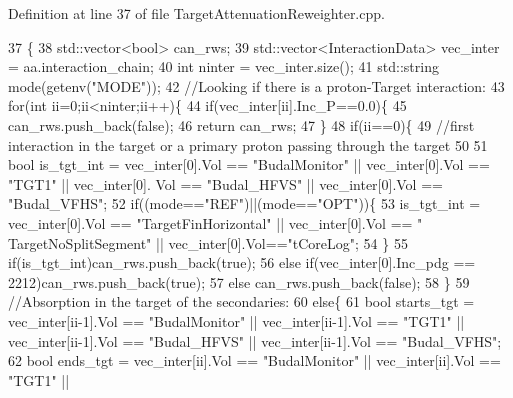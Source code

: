 Definition at line 37 of file Target\-Attenuation\-Reweighter.\-cpp.


\begin{DoxyCode}
37                                                                                         \{
38     std::vector<bool> can\_rws;
39     std::vector<InteractionData> vec\_inter = aa.interaction\_chain;
40     \textcolor{keywordtype}{int} ninter = vec\_inter.size();
41     std::string mode(getenv(\textcolor{stringliteral}{"MODE"}));
42     \textcolor{comment}{//Looking if there is a proton-Target interaction:}
43     \textcolor{keywordflow}{for}(\textcolor{keywordtype}{int} ii=0;ii<ninter;ii++)\{          
44         \textcolor{keywordflow}{if}(vec\_inter[ii].Inc\_P==0.0)\{
45           can\_rws.push\_back(\textcolor{keyword}{false});
46           \textcolor{keywordflow}{return} can\_rws;
47         \}
48     \textcolor{keywordflow}{if}(ii==0)\{
49       \textcolor{comment}{//first interaction in the target or a primary proton passing through the target }
50 
51         \textcolor{keywordtype}{bool} is\_tgt\_int = vec\_inter[0].Vol == \textcolor{stringliteral}{"BudalMonitor"} || vec\_inter[0].Vol == \textcolor{stringliteral}{"TGT1"} || vec\_inter[0].
      Vol == \textcolor{stringliteral}{"Budal\_HFVS"}  || vec\_inter[0].Vol == \textcolor{stringliteral}{"Budal\_VFHS"};
52         \textcolor{keywordflow}{if}((mode==\textcolor{stringliteral}{"REF"})||(mode==\textcolor{stringliteral}{"OPT"}))\{
53           is\_tgt\_int = vec\_inter[0].Vol == \textcolor{stringliteral}{"TargetFinHorizontal"} || vec\_inter[0].Vol == \textcolor{stringliteral}{"
      TargetNoSplitSegment"} || vec\_inter[0].Vol==\textcolor{stringliteral}{"tCoreLog"};
54         \}
55         \textcolor{keywordflow}{if}(is\_tgt\_int)can\_rws.push\_back(\textcolor{keyword}{true});
56         \textcolor{keywordflow}{else} \textcolor{keywordflow}{if}(vec\_inter[0].Inc\_pdg == 2212)can\_rws.push\_back(\textcolor{keyword}{true});
57         \textcolor{keywordflow}{else} can\_rws.push\_back(\textcolor{keyword}{false});
58       \}
59       \textcolor{comment}{//Absorption in the target of the secondaries:}
60       \textcolor{keywordflow}{else}\{
61         \textcolor{keywordtype}{bool} starts\_tgt = vec\_inter[ii-1].Vol == \textcolor{stringliteral}{"BudalMonitor"} || vec\_inter[ii-1].Vol == \textcolor{stringliteral}{"TGT1"} || 
      vec\_inter[ii-1].Vol == \textcolor{stringliteral}{"Budal\_HFVS"}  || vec\_inter[ii-1].Vol == \textcolor{stringliteral}{"Budal\_VFHS"};
62         \textcolor{keywordtype}{bool} ends\_tgt   = vec\_inter[ii].Vol   == \textcolor{stringliteral}{"BudalMonitor"} || vec\_inter[ii].Vol   == \textcolor{stringliteral}{"TGT1"} || 

\end{DoxyCode}
